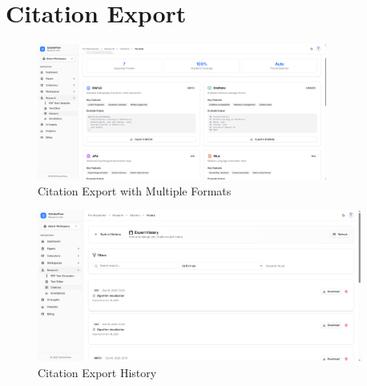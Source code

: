 \section{Citation Export}
\label{sec:screenshots-citations}

\begin{figure}[H]
\centering
\includegraphics[width=0.85\textwidth]{images/screenshots/citations_formats.png}
\caption{Citation Export with Multiple Formats}
\label{fig:screenshot-citations}
\end{figure}

\begin{figure}[H]
\centering
\includegraphics[width=0.95\textwidth]{images/screenshots/citations_history.png}
\caption{Citation Export History}
\label{fig:screenshot-citation-history}
\end{figure}
